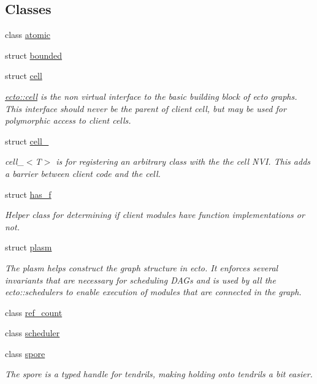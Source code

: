 \subsection*{Classes}
\begin{DoxyCompactItemize}
\item 
class \hyperlink{classecto_1_1atomic}{atomic}
\item 
struct \hyperlink{structecto_1_1bounded}{bounded}
\item 
struct \hyperlink{structecto_1_1cell}{cell}
\begin{DoxyCompactList}\small\item\em \hyperlink{structecto_1_1cell}{ecto\+::cell} is the non virtual interface to the basic building block of ecto graphs. This interface should never be the parent of client cell, but may be used for polymorphic access to client cells. \end{DoxyCompactList}\item 
struct \hyperlink{structecto_1_1cell__}{cell\+\_\+}
\begin{DoxyCompactList}\small\item\em cell\+\_\+$<$\+T$>$ is for registering an arbitrary class with the the cell N\+V\+I. This adds a barrier between client code and the cell. \end{DoxyCompactList}\item 
struct \hyperlink{structecto_1_1has__f}{has\+\_\+f}
\begin{DoxyCompactList}\small\item\em Helper class for determining if client modules have function implementations or not. \end{DoxyCompactList}\item 
struct \hyperlink{structecto_1_1plasm}{plasm}
\begin{DoxyCompactList}\small\item\em The plasm helps construct the graph structure in ecto. It enforces several invariants that are necessary for scheduling D\+A\+Gs and is used by all the ecto\+::schedulers to enable execution of modules that are connected in the graph. \end{DoxyCompactList}\item 
class \hyperlink{classecto_1_1ref__count}{ref\+\_\+count}
\item 
class \hyperlink{classecto_1_1scheduler}{scheduler}
\item 
class \hyperlink{structecto_1_1spore}{spore}
\begin{DoxyCompactList}\small\item\em The spore is a typed handle for tendrils, making holding onto tendrils a bit easier. \end{DoxyCompactList}\item 

\end{DoxyCompactItemize}
